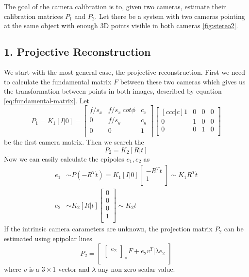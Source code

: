 The goal of the camera calibration is to, given two cameras, estimate their calibration matrices $P_1$ and $P_2$. Let there be a system with two cameras pointing at the same object with enough 3D points visible in both cameras \ref{fig:stereo2}. 
\subsection*{1. Projective Reconstruction}
We start with the most general case, the projective reconstruction. First we need to calculate the fundamental matrix $F$ between these two cameras which gives us the transformation between points in both images, described by equation \ref{eq:fundamental-matrix}. Let
\begin{equation}
	P_1= K_1[I|0] =
	\begin{bmatrix}
		f/s_x & f/s_x ~cot \phi & c_x \\
		0 & f/s_y & c_y \\
		0 & 0  & 1 \\
	\end{bmatrix}
	\begin{bmatrix}[ccc|c]
		1 & 0 & 0 & 0 \\
		0 & 1 & 0 & 0 \\
		0 & 0 & 1 & 0 \\
	\end{bmatrix}
\end{equation}
be the first camera matrix. Then we search the
\begin{equation}
	P_2 = K_2[R|t] 
\end{equation}
Now we can easily calculate the epipoles $e_1, e_2$ as
\begin{equation}
  \begin{aligned}
	e_1 &\sim P(-R^T t) = K_1 [I|0]
	\begin{bmatrix}
		-R^T t \\
		1 \\
	\end{bmatrix} \sim K_1 R^Tt \\
	e_2 &\sim K_2[R|t]
	\begin{bmatrix}
		0 \\
		0 \\
		0 \\
		1 \\
	\end{bmatrix} \sim K_2 t
  \end{aligned}
\end{equation}
If the intrinsic camera carameters are unknown, the projection matrix $P_2$ can be estimated using epipolar lines
\begin{equation}
	P_2 = 
	\begin{bmatrix}
		\begin{bmatrix}
			e_2 \\ 
		\end{bmatrix}_{\times} F + e_2 v^T | \lambda e_2 \\
	\end{bmatrix}
\end{equation}
where $v$ is a $3 \times 1$ vector and $\lambda$ any non-zero scalar value. 
